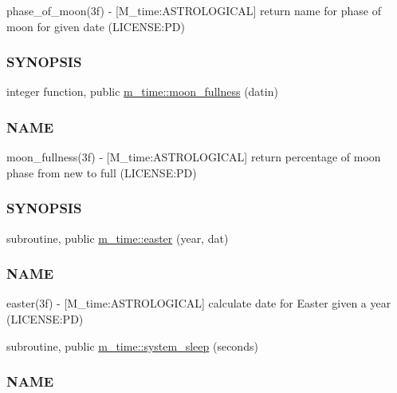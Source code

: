 \begin{DoxyCompactItemize}
\begin{DoxyCompactList}
phase\+\_\+of\+\_\+moon(3f) -\/ \mbox{[}M\+\_\+time\+:A\+S\+T\+R\+O\+L\+O\+G\+I\+C\+AL\mbox{]} return name for phase of moon for given date (L\+I\+C\+E\+N\+SE\+:PD) \subsubsection*{S\+Y\+N\+O\+P\+S\+IS}\end{DoxyCompactList}\item 
integer function, public \mbox{\hyperlink{namespacem__time_a702b39998a769b8f60070c0bec975ee2}{m\+\_\+time\+::moon\+\_\+fullness}} (datin)
\begin{DoxyCompactList}\small\item\em \subsubsection*{N\+A\+ME}

moon\+\_\+fullness(3f) -\/ \mbox{[}M\+\_\+time\+:A\+S\+T\+R\+O\+L\+O\+G\+I\+C\+AL\mbox{]} return percentage of moon phase from new to full (L\+I\+C\+E\+N\+SE\+:PD) \subsubsection*{S\+Y\+N\+O\+P\+S\+IS}\end{DoxyCompactList}\item 
subroutine, public \mbox{\hyperlink{namespacem__time_a5ccb70e20160fcf26bb403dbff1f138a}{m\+\_\+time\+::easter}} (year, dat)
\begin{DoxyCompactList}\small\item\em \subsubsection*{N\+A\+ME}

easter(3f) -\/ \mbox{[}M\+\_\+time\+:A\+S\+T\+R\+O\+L\+O\+G\+I\+C\+AL\mbox{]} calculate date for Easter given a year (L\+I\+C\+E\+N\+SE\+:PD) \end{DoxyCompactList}\item 
subroutine, public \mbox{\hyperlink{namespacem__time_a7c5d028ae1e1e01162ffc7bb55dcbbb1}{m\+\_\+time\+::system\+\_\+sleep}} (seconds)
\begin{DoxyCompactList}\small\item\em \subsubsection*{N\+A\+ME}


\end{DoxyCompactList}
\end{DoxyCompactItemize}
